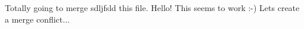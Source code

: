 Totally going to merge sdljfsld this file.
Hello!
This seems to work :-)
Lets create a merge conflict...
